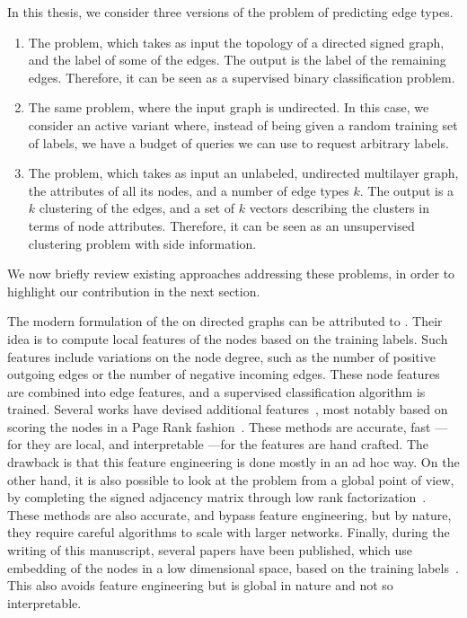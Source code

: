 In this thesis, we consider three versions of the problem of predicting edge types.
\begin{enumerate}

  \item The \esp{} problem, which takes as input the topology of a directed signed graph, and the
    label of some of the edges. The output is the label of the remaining edges. Therefore, it can be
    seen as a supervised binary classification problem.

  \item The same \esp{} problem, where the input graph is undirected. In this case, we consider an
    active variant where, instead of being given a random training set of labels, we have a budget of
    queries we can use to request arbitrary labels.

  \item The \ecp{} problem, which takes as input an unlabeled, undirected multilayer graph, the
    attributes of all its nodes, and a number of edge types $k$. The output is a $k$ clustering of
    the edges, and a set of $k$ vectors describing the clusters in terms of node attributes.
    Therefore, it can be seen as an unsupervised clustering problem with side information.
\end{enumerate}

We now briefly review existing approaches addressing these problems, in order to highlight our contribution
in the next section.

The modern formulation of the \esp{} on directed graphs can be attributed to
\textcite{Leskovec2010}. Their idea is to compute local features of the nodes based on the training
labels. Such features include variations on the node degree, such as the number of positive
outgoing edges or the number of negative incoming edges. These node features are combined into edge
features, and a supervised classification algorithm is trained. Several works have devised
additional features~\autocites{Bayesian15}{Yuan2017}, most notably based on scoring the nodes in a
Page Rank fashion~\autocites{traag2010exponential}{shahriari2014ranking}{wu2016troll}. These methods
are accurate, fast ---for they are local, and interpretable ---for the features are hand crafted.
The drawback is that this feature engineering is done mostly in an ad hoc way. On the other hand, it
is also possible to look at the problem from a global point of view, by completing the
signed adjacency matrix through low rank
factorization~\autocites{LowRankCompletion14}{OnlineCompletion17}. These methods are also accurate,
and bypass feature engineering, but by nature, they require careful algorithms to scale with larger
networks. Finally, during the writing of this manuscript, several papers have been published, which
use embedding of the nodes in a low dimensional space, based on the training
labels~\autocites{SIGNet17}{SNE17}. This also avoids feature engineering but is global in nature and
not so interpretable.

